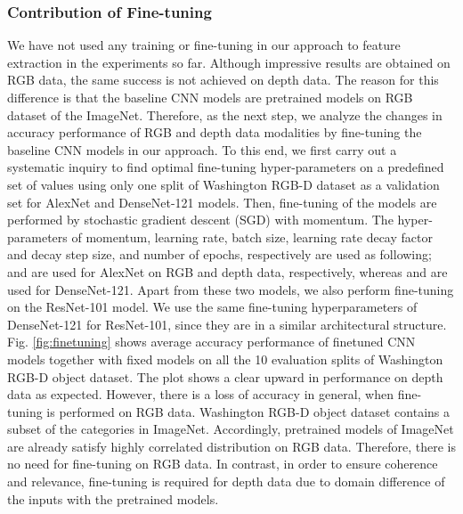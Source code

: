 \documentclass[10pt,journal,compsoc]{IEEEtran}
\begin{document}
\subsubsection{Contribution of Fine-tuning} \label{sec.exp.ma.finetuning}
\begin{figure*}
	\centering
	 \caption{Level-wise average accuracy performance of finetuned CNN models together with fixed models on all the 10-splits of Washington RGB-D dataset.}
	\label{fig:finetuning}
\end{figure*}
We have not used any training or fine-tuning in our approach to feature extraction in the experiments so far. Although impressive results are obtained on RGB data, the same success is not achieved on depth data. The reason for this difference is that the baseline CNN models are pretrained models on RGB dataset of the ImageNet. Therefore, as the next step, we analyze the changes in accuracy performance of RGB and depth data modalities by fine-tuning the baseline CNN models in our approach. To this end, we first carry out a systematic inquiry to find optimal fine-tuning hyper-parameters on a predefined set of values using only one split of Washington RGB-D dataset as a validation set for AlexNet and DenseNet-121 models. Then, fine-tuning of the models are performed by stochastic gradient descent (SGD) with momentum. The hyper-parameters of momentum, learning rate, batch size, learning rate decay factor and decay step size, and number of epochs, respectively are used as following;  and  are used for AlexNet on RGB and depth data, respectively, whereas  and  are used for DenseNet-121. Apart from these two models, we also perform fine-tuning on the ResNet-101 model. We use the same fine-tuning hyperparameters of DenseNet-121 for ResNet-101, since they are in a similar architectural structure. Fig. \ref{fig:finetuning} shows average accuracy performance of finetuned CNN models together with fixed models on all the 10 evaluation splits of Washington RGB-D object dataset. The plot shows a clear upward in performance on depth data as expected. However, there is a loss of accuracy in general, when fine-tuning is performed on RGB data. Washington RGB-D object dataset contains a subset of the categories in ImageNet. Accordingly, pretrained models of ImageNet are already satisfy highly correlated distribution on RGB data. Therefore, there is no need for fine-tuning on RGB data. In contrast, in order to ensure coherence and relevance, fine-tuning is required for depth data due to domain difference of the inputs with the pretrained models.
\end{document}

